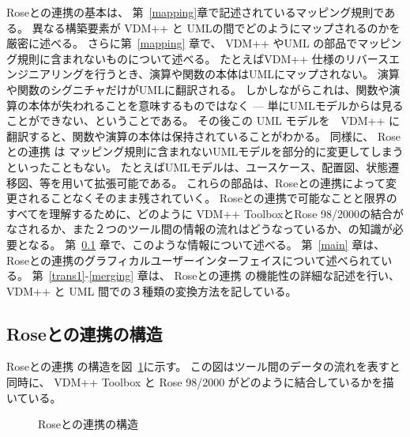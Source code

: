 \documentclass[\pformat,12pt]{jarticle}
\newcommand{\vdmpp}{VDM++}
\newcommand{\link}{Roseとの連携}
\newcommand{\rose}{Rose 98/2000}
\begin{document}
 \link{}の基本は、 第~\ref{mapping}章で記述されているマッピング規則である。
異なる構築要素が \vdmpp{} と UMLの間でどのようにマップされるのかを厳密に述べる。
さらに第~\ref{mapping} 章で、 \vdmpp{} やUML の部品でマッピング規則に含まれないものについて述べる。
たとえば\vdmpp{} 仕様のリバースエンジニアリングを行うとき、演算や関数の本体はUMLにマップされない。
演算や関数のシグニチャだけがUMLに翻訳される。
しかしながらこれは、関数や演算の本体が失われることを意味するものではなく --- 単にUMLモデルからは見ることができない、ということである。
その後この UML モデルを　\vdmpp{} に翻訳すると、関数や演算の本体は保持されていることがわかる。
同様に、 \link{} は マッピング規則に含まれないUMLモデルを部分的に変更してしまうといったこともない。 
たとえばUMLモデルは、ユースケース、配置図、状態遷移図、等を用いて拡張可能である。 
これらの部品は、\link{}によって変更されることなくそのまま残されていく。
\link{}で可能なことと限界のすべてを理解するために、どのように \vdmpp{} Toolboxと\rose{}の結合がなされるか、また２つのツール間の情報の流れはどうなっているか、の知識が必要となる。
第~\ref{architecture} 章で、このような情報について述べる。
第~\ref{main} 章は、\link{}のグラフィカルユーザーインターフェイスについて述べられている。
第~\ref{trans1}-\ref{merging} 章は、 \link{} の機能性の詳細な記述を行い、\vdmpp{} と UML 間での３種類の変換方法を記している。

\subsection{\link{}の構造} \label{architecture}  

 \link{} の構造を図~\ref{fig:architecture}に示す。
この図はツール間のデータの流れを表すと同時に、 \vdmpp{} Toolbox と \rose{} がどのように結合しているかを描いている。

\begin{figure}[htb]
\begin{center}
\mbox{}
\caption{\link{}の構造　\label{fig:architecture}}
\end{center}
\end{figure}
\end{document}
